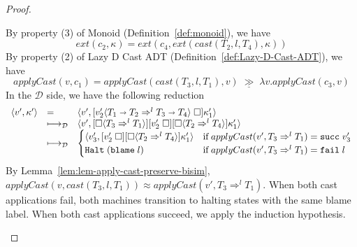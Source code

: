 \documentclass[acmsmall,review]{acmart}\settopmatter{printfolios=true,printccs=false,printacmref=false}
\newcommand{\mbind}{\ensuremath{\;\underline{\gg}\;}}
\newcommand{\sOOreturn}[2]{\langle#1,#2\rangle}
\newcommand{\sOOhalt}[1]{\mathtt{Halt} \; #1}
\newcommand{\POOfun}[2]{#1 \shortrightarrow #2}
\newcommand{\cOOcast}[3]{#1 \Rightarrow^{#2} #3}
\newcommand{\oOOblame}[1]{\mathtt{blame} \; #1}
\newcommand{\vOOcast}[2]{#1\langle#2\rangle}
\newcommand{\rOOsucc}[1]{\mathtt{succ}\;#1}
\newcommand{\rOOfail}[1]{\mathtt{fail}\;#1}
\newcommand{\kOOappII}[2]{
  [#1 \; \square]#2}
\newcommand{\kOOcast}[2]{
  [\square \langle #1 \rangle]#2}
\newcommand{\sidecond}[1]{\text{if}\;#1}
\newcommand{\judgeSreduce}[3]{#2 \longmapsto_{\mathcal{S}(#1)} #3}
\newcommand{\judgeSreduceTrans}[3]{#2 \longmapsto_{\mathcal{S}(#1)}^{*} #3}
\newcommand{\ineffCEKD}{\ensuremath{\mathcal{D}}}
\newcommand{\judgeDreduce}[2]{#1 \longmapsto_{\mathcal{D}} #2}
\newcommand{\judgeDreduceTrans}[2]{#1 \longmapsto_{\mathcal{D}}^{*} #2}
\newcommand{\effCEK}[1]{\ensuremath{\mathcal{S}(#1)}}
\begin{document}
\begin{proof}
\begin{description}
By property (3) of Monoid (Definition~\ref{def:monoid}), we have
\[
ext(c_2,\kappa) = ext(c_4,ext(cast(T_2,l,T_4),\kappa))
\]
By property (2) of Lazy D Cast ADT (Definition~\ref{def:Lazy-D-Cast-ADT}), 
we have
\[
applyCast(v,c_1) = applyCast(cast(T_3,l,T_1), v) \mbind{} \lambda v. 
applyCast(c_3,v)
\]
In the \ineffCEKD{} side, we have the following reduction
\[
\begin{array}{rll}
\sOOreturn{v'}{\kappa'} 
&=
&\sOOreturn{v'}{\kOOappII{\vOOcast{v_2'}{\cOOcast{\POOfun{T_1}{T_2}}{l}{\POOfun{T_3}{T_4}}}}{\kappa_1'}}\\
&\longmapsto_{\ineffCEKD}
&\sOOreturn{v'}{\kOOcast{\cOOcast{T_3}{l}{T_1}}{\kOOappII{v_2'}{\kOOcast{\cOOcast{T_2}{l}{T_4}}{\kappa_1'}}}}\\
&\longmapsto_{\ineffCEKD}
&\begin{cases}
	\sOOreturn{v_3'}{{\kOOappII{v_2'}{\kOOcast{\cOOcast{T_2}{l}{T_4}}{\kappa_1'}}}}
		& \sidecond{applyCast(v',\cOOcast{T_3}{l}{T_1}) = \rOOsucc{v_3'}}\\
	\sOOhalt{(\oOOblame{l})} 
		& \sidecond{applyCast(v',\cOOcast{T_3}{l}{T_1}) = \rOOfail{l}}
\end{cases}
\end{array}
\]
By Lemma~\ref{lem:lem-apply-cast-preserve-bisim}, 
$applyCast(v,cast(T_3,l,T_1)) \approx applyCast(v',\cOOcast{T_3}{l}{T_1})$.  
When both cast applications fail, both machines transition to halting states 
with the same blame label.
When both cast applications succeed, we apply the induction hypothesis.
\end{description}

\end{proof}
%
\end{document}

